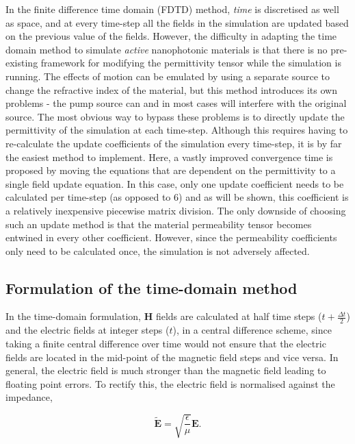 In the finite difference time domain (FDTD) method, \textit{time} is discretised as well as space, and at every time-step all the fields in the simulation are updated based on the previous value of the fields. However, the difficulty in adapting the time domain method to simulate \textit{active} nanophotonic materials is that there is no pre-existing framework for modifying the permittivity tensor while the simulation is running. The effects of motion can be emulated by using a separate source to change the refractive index of the material, but this method introduces its own problems - the pump source can and in most cases will interfere with the original source. The most obvious way to bypass these problems is to directly update the permittivity of the simulation at each time-step. Although this requires having to re-calculate the update coefficients of the simulation every time-step, it is by far the easiest method to implement. Here, a vastly improved convergence time is proposed by moving the equations that are dependent on the permittivity to a single field update equation. In this case, only one update coefficient needs to be calculated per time-step (as opposed to 6) and as will be shown, this coefficient is a relatively inexpensive piecewise matrix division. The only downside of choosing such an update method is that the material permeability tensor becomes entwined in every other coefficient. However, since the permeability coefficients only need to be calculated once, the simulation is not adversely affected.

\subsection{Formulation of the time-domain method}

In the time-domain formulation, $\bm{H}$ fields are calculated at half time steps ($t + \frac{\Delta t}{2}$) and the electric fields at integer steps ($t$), in a central difference scheme, since taking a finite central difference over time would not ensure that the electric fields are located in the mid-point of the magnetic field steps and vice versa. In general, the electric field is much stronger than the magnetic field leading to floating point errors. To rectify this, the electric field is normalised against the impedance,

\begin{equation}
\tilde{\bm{E}} = \sqrt{\dfrac{\epsilon}{\mu}} \bm{E}.
\end{equation}

